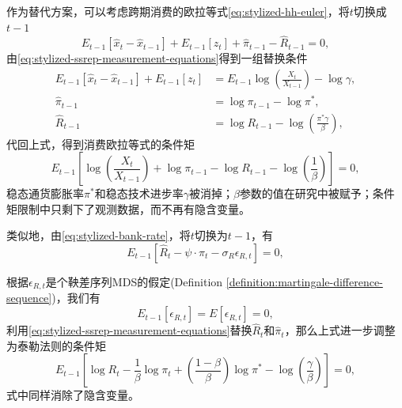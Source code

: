 作为替代方案，可以考虑跨期消费的欧拉等式\eqref{eq:stylized-hh-euler}，将$t$切换成$t-1$
\begin{equation*}
  E_{t-1} \left[
  \hat{x}_{t} - \hat{x}_{t-1}
  \right]
  + E_{t-1} \left[ z_{t} \right]
  + \hat{\pi}_{t-1} - \hat{R}_{t-1}=0,
\end{equation*}
由\eqref{eq:stylized-ssrep-measurement-equations}得到一组替换条件
\begin{equation*}
  \begin{split}
    E_{t-1} \left[
    \hat{x}_{t} - \hat{x}_{t-1}
    \right]
    + E_{t-1} \left[ z_{t} \right] & = E_{t-1} \log \left( \frac{X_{t}}{X_{t-1}} \right) - \log \gamma, \\
    \hat{\pi}_{t-1} & = \log \pi_{t-1} - \log \pi^{*}, \\
    \hat{R}_{t-1} & = \log R_{t-1} - \log \left( \frac{\pi^{*} \gamma }{\beta} \right),
  \end{split}
\end{equation*}
代回上式，得到消费欧拉等式的条件矩
\begin{equation}
  \label{eq:stylized-sspre-moment-euler-info-set}
  E_{t-1} \left[
  \log \left( \frac{X_{t}}{X_{t-1}} \right)
  + \log \pi_{t-1} - \log R_{t-1} - \log \left( \frac{1}{\beta} \right)
  \right]=0,
\end{equation}
稳态通货膨胀率$\pi^{*}$和稳态技术进步率$\gamma$被消掉；$\beta$参数的值在研究中被赋予；条件矩限制中只剩下了观测数据，而不再有隐含变量。

类似地，由\eqref{eq:stylized-bank-rate}，将$t$切换为$t-1$，有
\begin{equation*}
  E_{t-1} \left[ \hat{R}_{t} - \psi \cdot \hat{\pi}_{t} - \sigma_{R} \epsilon_{R,t} \right]=0,
\end{equation*}

根据$\epsilon_{R,t}$是个鞅差序列MDS的假定(Definition \ref{definition:martingale-difference-sequence})，我们有
\begin{equation*}
  E_{t-1} \left[ \epsilon_{R,t} \right] = E \left[ \epsilon_{R,t} \right] = 0,
\end{equation*}
利用\eqref{eq:stylized-ssrep-measurement-equations}替换$\hat{R}_{t}$和$\hat{\pi}_{t}$，那么上式进一步调整为泰勒法则的条件矩
\begin{equation}
  \label{eq:stylized-sspre-moment-taylor-info-set}
  E_{t-1}
  \left[
  \log R_{t} - \frac{1}{\beta} \log \pi_{t} + \left( \frac{1 - \beta}{\beta} \right) \log \pi^{*} - \log \left( \frac{\gamma}{\beta} \right)
  \right] = 0,
\end{equation}
式中同样消除了隐含变量。

